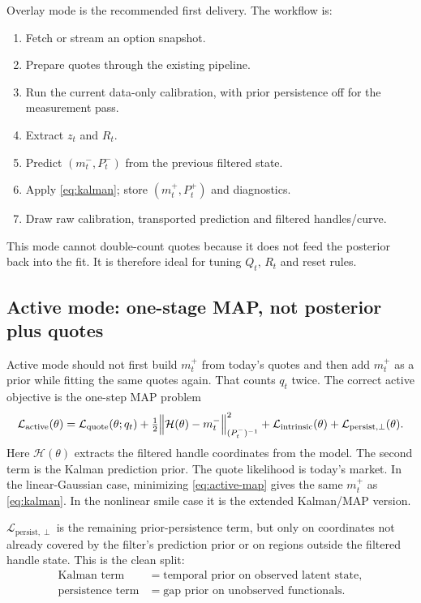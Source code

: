 \documentclass[11pt]{article}
\newcommand{\calL}{\mathcal L}
\newcommand{\calH}{\mathcal H}
\begin{document}
Overlay mode is the recommended first delivery. The workflow is:
\begin{enumerate}[leftmargin=1.6em]
\item Fetch or stream an option snapshot.
\item Prepare quotes through the existing pipeline.
\item Run the current data-only calibration, with prior persistence off for the
measurement pass.
\item Extract $z_t$ and $R_t$.
\item Predict $(m_t^-,P_t^-)$ from the previous filtered state.
\item Apply \eqref{eq:kalman}; store $(m_t^+,P_t^+)$ and diagnostics.
\item Draw raw calibration, transported prediction and filtered handles/curve.
\end{enumerate}
This mode cannot double-count quotes because it does not feed the posterior back
into the fit. It is therefore ideal for tuning $Q_t$, $R_t$ and reset rules.

\subsection{Active mode: one-stage MAP, not posterior plus quotes}

Active mode should not first build $m_t^+$ from today's quotes and then add
$m_t^+$ as a prior while fitting the same quotes again. That counts $q_t$ twice.
The correct active objective is the one-step MAP problem
\begin{equation}
\calL_{\mathrm{active}}(\theta)
=\calL_{\mathrm{quote}}(\theta;q_t)
+\half\norm[\Big]{\calH(\theta)-m_t^-}_{(P_t^-)^{-1}}^2
+\calL_{\mathrm{intrinsic}}(\theta)
+\calL_{\mathrm{persist},\perp}(\theta).
\label{eq:active-map}
\end{equation}
Here $\calH(\theta)$ extracts the filtered handle coordinates from the model.
The second term is the Kalman prediction prior. The quote likelihood is today's
market. In the linear-Gaussian case, minimizing \eqref{eq:active-map} gives the
same $m_t^+$ as \eqref{eq:kalman}. In the nonlinear smile case it is the extended
Kalman/MAP version.

$\calL_{\mathrm{persist},\perp}$ is the remaining prior-persistence term, but
only on coordinates not already covered by the filter's prediction prior or on
regions outside the filtered handle state. This is the clean split:
\[
\begin{aligned}
\text{Kalman term}
&=\text{temporal prior on observed latent state},\\
\text{persistence term}
&=\text{gap prior on unobserved functionals}.
\end{aligned}
\]
\end{document}
